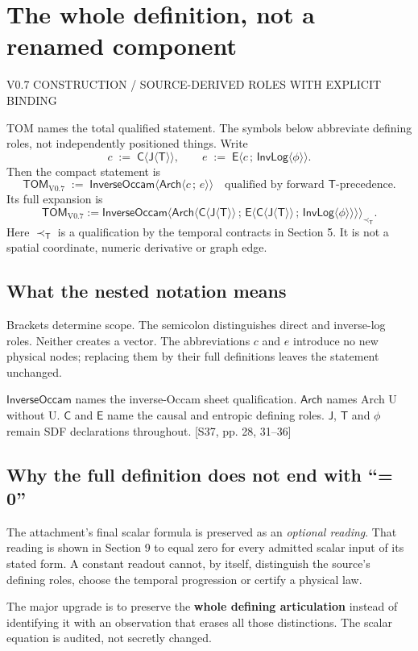 \documentclass[11pt,a4paper]{article}
\newcommand{\newsec}[2]{\clearpage\section{#1}{\sffamily\footnotesize\color{teal}\MakeUppercase{#2}\par}\vspace{5pt}}
\newcommand{\src}[1]{{\small\color{muted}[S37, #1]}}
\newcommand{\Tom}{\mathsf{TOM}}
\newcommand{\Ti}{\mathsf T}
\newcommand{\Ji}{\mathsf J}
\newcommand{\Ca}{\mathsf C}
\newcommand{\En}{\mathsf E}
\newcommand{\IL}{\mathsf{InvLog}}
\newcommand{\IO}{\mathsf{InverseOccam}}
\newcommand{\Ar}{\mathsf{Arch}}
\newcommand{\bind}[1]{\langle #1\rangle}
\begin{document}
\newsec{The whole definition, not a renamed component}{V0.7 construction / source-derived roles with explicit binding}
TOM names the total qualified statement. The symbols below abbreviate defining roles, not independently positioned things. Write
\[
 c\;:=\;\Ca\bind{\Ji\bind{\Ti}},\qquad
 e\;:=\;\En\bind{c\,;\,\IL\bind{\phi}}.
\]
Then the compact statement is
\begin{equation*}
\boxed{\Tom_{\mathrm{V0.7}}\;:=\;\IO\bind{\Ar\bind{c\,;\,e}}\quad
\text{qualified by forward }\Ti\text{-precedence}.}
\end{equation*}
Its full expansion is
\[
\Tom_{\mathrm{V0.7}}:=
\IO\Big\langle
\Ar\Big\langle
\Ca\bind{\Ji\bind{\Ti}}\,;\,
\En\bind{\Ca\bind{\Ji\bind{\Ti}}\,;\,\IL\bind{\phi}}
\Big\rangle
\Big\rangle_{\prec_{\Ti}}.
\]
Here $\prec_{\Ti}$ is a qualification by the temporal contracts in Section 5. It is not a spatial coordinate, numeric derivative or graph edge.

\subsection{What the nested notation means}
Brackets determine scope. The semicolon distinguishes direct and inverse-log roles. Neither creates a vector. The abbreviations $c$ and $e$ introduce no new physical nodes; replacing them by their full definitions leaves the statement unchanged.

$\IO$ names the inverse-Occam sheet qualification. $\Ar$ names Arch U without U. $\Ca$ and $\En$ name the causal and entropic defining roles. $\Ji$, $\Ti$ and $\phi$ remain SDF declarations throughout. \src{pp. 28, 31--36}

\subsection{Why the full definition does not end with ``= 0''}
The attachment's final scalar formula is preserved as an \emph{optional reading}. That reading is shown in Section 9 to equal zero for every admitted scalar input of its stated form. A constant readout cannot, by itself, distinguish the source's defining roles, choose the temporal progression or certify a physical law.

\begin{boxx}
The major upgrade is to preserve the \textbf{whole defining articulation} instead of identifying it with an observation that erases all those distinctions. The scalar equation is audited, not secretly changed.
\end{boxx}
\end{document}
